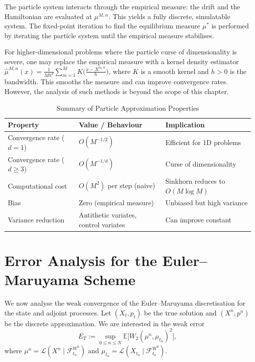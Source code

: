 The particle system interacts through the empirical measure: the drift and the
Hamiltonian are evaluated at $\mu^{M,n}$. This yields a fully discrete, simulatable
system. The fixed-point iteration to find the equilibrium measure $\mu^*$ is performed
by iterating the particle system until the empirical measure stabilises.

\begin{remark}
For higher-dimensional problems where the particle curse of dimensionality is severe,
one may replace the empirical measure with a kernel density estimator
$\hat\mu^{M,n}(x) = \frac{1}{Mh^d}\sum_{m=1}^M K\big(\frac{x - X^{m,n}}{h}\big)$, where
$K$ is a smooth kernel and $h > 0$ is the bandwidth. This smooths the measure and can
improve convergence rates. However, the analysis of such methods is beyond the scope
of this chapter.
\end{remark}

\begin{table}[ht]
\centering
\caption{Summary of Particle Approximation Properties}
\label{tab:particle-properties}
\begin{tabular}{p{3.5cm}p{3.5cm}p{5cm}}
\toprule
\textbf{Property} & \textbf{Value / Behaviour} & \textbf{Implication} \\
\midrule
Convergence rate ($d=1$) & $O(M^{-1/2})$ & Efficient for 1D problems \\
Convergence rate ($d \geq 3$) & $O(M^{-1/d})$ & Curse of dimensionality \\
Computational cost & $O(M^2)$ per step (naive) & Sinkhorn reduces to
    $O(M \log M)$ \\
Bias & Zero (empirical measure) & Unbiased but high variance \\
Variance reduction & Antithetic variates, control variates & Can improve constant \\
\bottomrule
\end{tabular}
\end{table}


\section{Error Analysis for the Euler--Maruyama Scheme}
\label{sec:na-em-error}

We now analyse the weak convergence of the Euler--Maruyama discretisation for the
state and adjoint processes. Let $(X_t, p_t)$ be the true solution and $(X^n, p^n)$ be
the discrete approximation. We are interested in the weak error
\[
    E_T := \sup_{0 \leq n \leq N} \mathbb{E}\big[ W_2(\mu^n, \mu_{t_n})^2 \big],
\]
where $\mu^n = \mathcal{L}(X^n \mid \mathcal{F}_{t_n}^{W^0})$ and
$\mu_{t_n} = \mathcal{L}(X_{t_n} \mid \mathcal{F}_{t_n}^{W^0})$.

